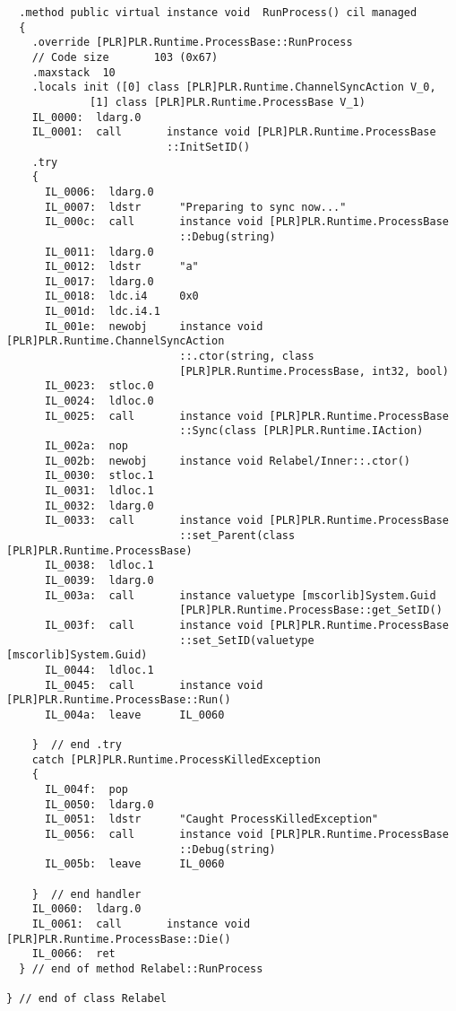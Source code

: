 \begin{lstlisting}
  .method public virtual instance void  RunProcess() cil managed
  {
    .override [PLR]PLR.Runtime.ProcessBase::RunProcess
    // Code size       103 (0x67)
    .maxstack  10
    .locals init ([0] class [PLR]PLR.Runtime.ChannelSyncAction V_0,
             [1] class [PLR]PLR.Runtime.ProcessBase V_1)
    IL_0000:  ldarg.0
    IL_0001:  call       instance void [PLR]PLR.Runtime.ProcessBase
                         ::InitSetID()
    .try
    {
      IL_0006:  ldarg.0
      IL_0007:  ldstr      "Preparing to sync now..."
      IL_000c:  call       instance void [PLR]PLR.Runtime.ProcessBase
                           ::Debug(string)
      IL_0011:  ldarg.0
      IL_0012:  ldstr      "a"
      IL_0017:  ldarg.0
      IL_0018:  ldc.i4     0x0
      IL_001d:  ldc.i4.1
      IL_001e:  newobj     instance void [PLR]PLR.Runtime.ChannelSyncAction
                           ::.ctor(string, class 
                           [PLR]PLR.Runtime.ProcessBase, int32, bool)
      IL_0023:  stloc.0
      IL_0024:  ldloc.0
      IL_0025:  call       instance void [PLR]PLR.Runtime.ProcessBase
                           ::Sync(class [PLR]PLR.Runtime.IAction)
      IL_002a:  nop
      IL_002b:  newobj     instance void Relabel/Inner::.ctor()
      IL_0030:  stloc.1
      IL_0031:  ldloc.1
      IL_0032:  ldarg.0
      IL_0033:  call       instance void [PLR]PLR.Runtime.ProcessBase
                           ::set_Parent(class [PLR]PLR.Runtime.ProcessBase)
      IL_0038:  ldloc.1
      IL_0039:  ldarg.0
      IL_003a:  call       instance valuetype [mscorlib]System.Guid 
                           [PLR]PLR.Runtime.ProcessBase::get_SetID()
      IL_003f:  call       instance void [PLR]PLR.Runtime.ProcessBase
                           ::set_SetID(valuetype [mscorlib]System.Guid)
      IL_0044:  ldloc.1
      IL_0045:  call       instance void [PLR]PLR.Runtime.ProcessBase::Run()
      IL_004a:  leave      IL_0060

    }  // end .try
    catch [PLR]PLR.Runtime.ProcessKilledException 
    {
      IL_004f:  pop
      IL_0050:  ldarg.0
      IL_0051:  ldstr      "Caught ProcessKilledException"
      IL_0056:  call       instance void [PLR]PLR.Runtime.ProcessBase
                           ::Debug(string)
      IL_005b:  leave      IL_0060

    }  // end handler
    IL_0060:  ldarg.0
    IL_0061:  call       instance void [PLR]PLR.Runtime.ProcessBase::Die()
    IL_0066:  ret
  } // end of method Relabel::RunProcess

} // end of class Relabel

	\end{lstlisting}

